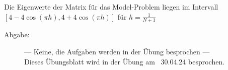 \documentclass[a4paper,11pt]{scrartcl}
\begin{document}
\begin{hinweis}{ Die Eigenwerte der Matrix für das Model-Problem liegen im Intervall $[ 4- 4\cos(\pi h), 4 + 4\cos(\pi h)]$ für $h = \frac{1}{N+1}$
}\end{hinweis}

\begin{description}
\item[Abgabe:] --- Keine, die Aufgaben werden in der Übung besprochen ---\\
Dieses Übungsblatt wird in der Übung am ~30.04.24 besprochen.


\end{description}
\end{document}
